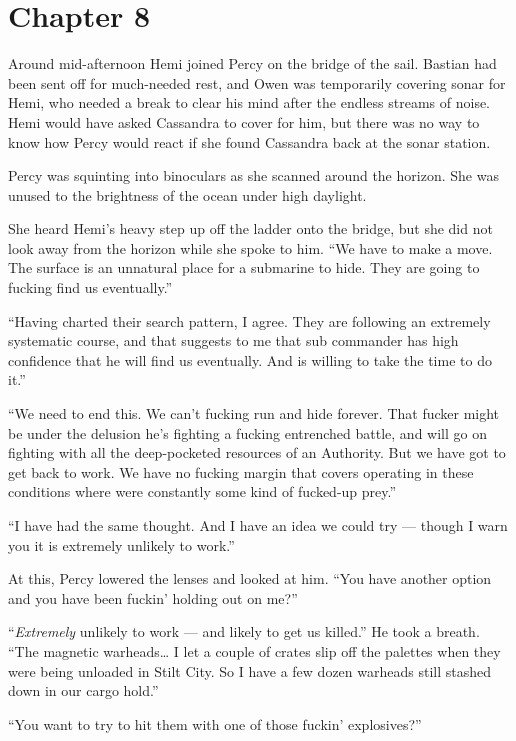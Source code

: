 \documentclass[]{scrbook}
\begin{document}
\hypertarget{chapter-8}{%
\chapter*{Chapter 8}\label{chapter-8}}

Around mid-afternoon Hemi joined Percy on the bridge of the sail.
Bastian had been sent off for much-needed rest, and Owen was temporarily
covering sonar for Hemi, who needed a break to clear his mind after the
endless streams of noise. Hemi would have asked Cassandra to cover for
him, but there was no way to know how Percy would react if she found
Cassandra back at the sonar station.

Percy was squinting into binoculars as she scanned around the horizon.
She was unused to the brightness of the ocean under high daylight.

She heard Hemi's heavy step up off the ladder onto the bridge, but she
did not look away from the horizon while she spoke to him. ``We have to
make a move. The surface is an unnatural place for a submarine to hide.
They are going to fucking find us eventually.''

``Having charted their search pattern, I agree. They are following an
extremely systematic course, and that suggests to me that sub commander
has high confidence that he will find us eventually. And is willing to
take the time to do it.''

``We need to end this. We can't fucking run and hide forever. That
fucker might be under the delusion he's fighting a fucking entrenched
battle, and will go on fighting with all the deep-pocketed resources of
an Authority. But we have got to get back to work. We have no fucking
margin that covers operating in these conditions where were constantly
some kind of fucked-up prey.''

``I have had the same thought. And I have an idea we could try ---
though I warn you it is extremely unlikely to work.''

At this, Percy lowered the lenses and looked at him. ``You have another
option and you have been fuckin' holding out on me?''

``\emph{Extremely} unlikely to work --- and likely to get us killed.''
He took a breath. ``The magnetic warheads\ldots{} I let a couple of
crates slip off the palettes when they were being unloaded in Stilt
City. So I have a few dozen warheads still stashed down in our cargo
hold.''

``You want to try to hit them with one of those fuckin' explosives?''
\end{document}
